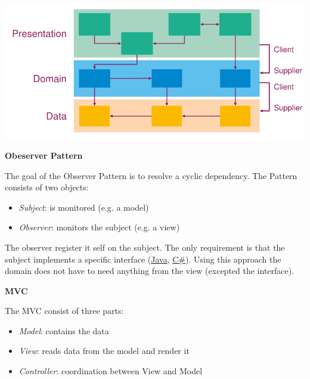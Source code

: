 \documentclass[11pt,twoside,landscape]{article}
\begin{document}
\begin{multicols}{3}
\begin{center}
\includegraphics[width=.9\linewidth]{img/layer_architecture.png}
\end{center}


\textbf{Obeserver Pattern}

The goal of the Observer Pattern is to resolve a cyclic dependency.
The Pattern consists of two objects:

\begin{itemize}
\item \emph{Subject}: is monitored (e.g. a model)
\item \emph{Observer}: monitors the subject (e.g. a view)
\end{itemize}


The observer register it self on the subject.
The only requirement is that the subject implements a specific interface (\href{../../../roam/20201116150053-java.org}{Java}, \href{../../../roam/20211003114158-c.org}{C\#}).
Using this approach the domain does not have to need anything from the view (excepted the interface).

\textbf{MVC}

The MVC consist of three parts:
\begin{itemize}
\item \emph{Model}: contains the data
\item \emph{View}: reads data from the model and render it
\item \emph{Controller}: coordination between View and Model
\end{itemize}



\end{multicols}
\end{document}
